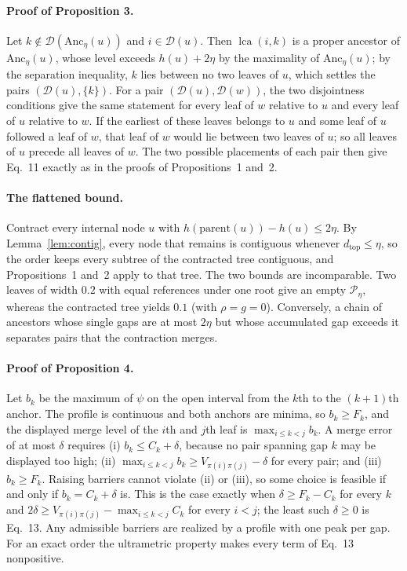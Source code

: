 \documentclass[preprint]{vgtc}
\newcommand{\dtop}{d_{\mathrm{top}}}
\newcommand{\lca}{\operatorname{lca}}
\begin{document}
\paragraph{Proof of Proposition 3.} Let $k\notin\mathcal D(\mathrm{Anc}_\eta(u))$ and $i\in\mathcal D(u)$. Then $\lca(i,k)$ is a proper ancestor of $\mathrm{Anc}_\eta(u)$, whose level exceeds $h(u)+2\eta$ by the maximality of $\mathrm{Anc}_\eta(u)$; by the separation inequality, $k$ lies between no two leaves of $u$, which settles the pairs $(\mathcal D(u),\{k\})$. For a pair $(\mathcal D(u),\mathcal D(w))$, the two disjointness conditions give the same statement for every leaf of $w$ relative to $u$ and every leaf of $u$ relative to $w$. If the earliest of these leaves belongs to $u$ and some leaf of $u$ followed a leaf of $w$, that leaf of $w$ would lie between two leaves of $u$; so all leaves of $u$ precede all leaves of $w$. The two possible placements of each pair then give Eq.~11 exactly as in the proofs of Propositions~1 and~2.

\paragraph{The flattened bound.} Contract every internal node $u$ with $h(\mathrm{parent}(u))-h(u)\le2\eta$. By Lemma~\ref{lem:contig}, every node that remains is contiguous whenever $\dtop\le\eta$, so the order keeps every subtree of the contracted tree contiguous, and Propositions~1 and~2 apply to that tree. The two bounds are incomparable. Two leaves of width $0.2$ with equal references under one root give an empty $\mathcal P_\eta$, whereas the contracted tree yields $0.1$ (with $\rho=g=0$). Conversely, a chain of ancestors whose single gaps are at most $2\eta$ but whose accumulated gap exceeds it separates pairs that the contraction merges.

\paragraph{Proof of Proposition 4.} Let $b_k$ be the maximum of $\psi$ on the open interval from the $k$th to the $(k+1)$th anchor. The profile is continuous and both anchors are minima, so $b_k\ge F_k$, and the displayed merge level of the $i$th and $j$th leaf is $\max_{i\le k<j}b_k$. A merge error of at most $\delta$ requires (i) $b_k\le C_k+\delta$, because no pair spanning gap $k$ may be displayed too high; (ii) $\max_{i\le k<j}b_k\ge V_{\pi(i)\pi(j)}-\delta$ for every pair; and (iii) $b_k\ge F_k$. Raising barriers cannot violate (ii) or (iii), so some choice is feasible if and only if $b_k=C_k+\delta$ is. This is the case exactly when $\delta\ge F_k-C_k$ for every $k$ and $2\delta\ge V_{\pi(i)\pi(j)}-\max_{i\le k<j}C_k$ for every $i<j$; the least such $\delta\ge0$ is Eq.~13. Any admissible barriers are realized by a profile with one peak per gap. For an exact order the ultrametric property makes every term of Eq.~13 nonpositive.
\end{document}
